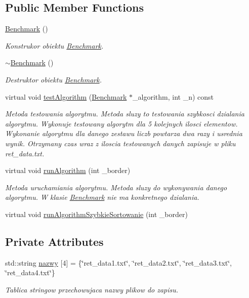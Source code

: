 \subsection*{Public Member Functions}
\begin{DoxyCompactItemize}
\item 
\hyperlink{class_benchmark_acfca497989836a688d44477802e822d8}{Benchmark} ()
\begin{DoxyCompactList}\small\item\em Konstrukor obiektu \hyperlink{class_benchmark}{Benchmark}. \end{DoxyCompactList}\item 
\hyperlink{class_benchmark_a20476e07f09e2b20ed3e9a7f13a570e6}{$\sim$\-Benchmark} ()
\begin{DoxyCompactList}\small\item\em Destruktor obiektu \hyperlink{class_benchmark}{Benchmark}. \end{DoxyCompactList}\item 
virtual void \hyperlink{class_benchmark_a900bc0d26c2ed6aa45afe4d5b295ccd1}{test\-Algorithm} (\hyperlink{class_benchmark}{Benchmark} $\ast$\-\_\-algorithm, int \-\_\-n) const 
\begin{DoxyCompactList}\small\item\em Metoda testowania algorytmu. Metoda sluzy to testowania szybkosci dzialania algorytmu. Wykonuje testowany algorytm dla 5 kolejnych ilosci elementow. Wykonanie algorytmu dla danego zestawu liczb powtarza dwa razy i usrednia wynik. Otrzymany czas wraz z iloscia testowanych danych zapisuje w pliku ret\-\_\-data.\-txt. \end{DoxyCompactList}\item 
virtual void \hyperlink{class_benchmark_a6363894c058e8bfe146de09d7126b29c}{run\-Algorithm} (int \-\_\-border)
\begin{DoxyCompactList}\small\item\em Metoda uruchamiania algorytmu. Metoda sluzy do wykonywania danego algorytmu. W klasie \hyperlink{class_benchmark}{Benchmark} nie ma konkretnego dzialania. \end{DoxyCompactList}\item 
virtual void \hyperlink{class_benchmark_a66dac1629afaba9ab4e139e3cad8a856}{run\-Algorithm\-Szybkie\-Sortowanie} (int \-\_\-border)
\end{DoxyCompactItemize}
\subsection*{Private Attributes}
\begin{DoxyCompactItemize}
\item 
std\-::string \hyperlink{class_benchmark_aee0beda65009e7334d34c5957f78c49a}{nazwy} \mbox{[}4\mbox{]} = \{\char`\"{}ret\-\_\-data1.\-txt\char`\"{}, \char`\"{}ret\-\_\-data2.\-txt\char`\"{}, \char`\"{}ret\-\_\-data3.\-txt\char`\"{}, \char`\"{}ret\-\_\-data4.\-txt\char`\"{}\}
\begin{DoxyCompactList}\small\item\em Tablica stringow przechowujaca nazwy plikow do zapisu. \end{DoxyCompactList}\end{DoxyCompactItemize}


